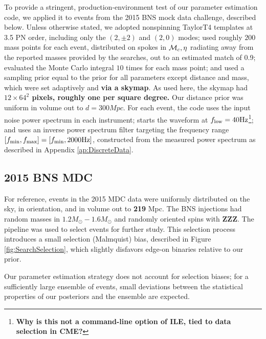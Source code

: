 \label{sec:Results}

To provide a stringent, production-environment test of our parameter estimation code, we applied it to \nEventsMDC{}
events from the 2015 BNS mock data challenge, described below.  
%
Unless otherwise stated, we adopted nonspinning TaylorT4 templates at 3.5 PN order, including only the $(2,\pm 2)$ and
$(2,0)$ modes;  used roughly $200$ mass points for each event, distributed on spokes in ${{\cal M}_c},\eta$ radiating away from the reported
masses  provided by the searches, out to an estimated match of 0.9; 
 evaluated the Monte Carlo integral $10$ times for each mass point; and used a sampling prior equal to the prior for all
 parameters except distance and mass, which were set adaptively and \textbf{via a skymap}.    As used here, the skymap had
 \textbf{$12\times 64^2$ pixels, roughly one per square degree.}  Our distance prior was
 uniform in volume out to $d=300\unit{Mpc}$.  
For each event, the code uses the \gstlal{} input noise power spectrum in each instrument; starts the waveform at $f_{\rm
  low}=40{\rm Hz}$\footnote{ \textbf{Why is this not a command-line option of ILE, tied to data selection in CME?}};
and uses an inverse power spectrum filter targeting the frequency range $[f_{\rm min},f_{\rm max}]=[f_{\rm min},
  2000{\rm Hz}]$, constructed from the measured power spectrum as described in Appendix \ref{ap:DiscreteData}.  

\subsection{2015 BNS MDC}


For reference, events in the 2015 MDC data were uniformly distributed on the sky, in orientation, and in volume out to
\textbf{219} \unit{Mpc}.  The BNS injections had random masses in $1.2 M_\odot-1.6 M_\odot$ and randomly oriented spins with
\textbf{ZZZ}.   The \gstlal{} pipeline was used to select events for further study.  This selection process introduces a
small selection (Malmquist) bias, described in Figure \ref{fig:SearchSelection}, 
which slightly disfavors edge-on binaries relative to our prior.    
%

Our parameter estimation strategy does not account for selection biases; for a sufficiently large ensemble of events,
small deviations between the statistical properties of our posteriors and the ensemble are expected. 


